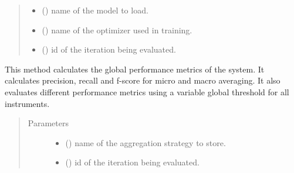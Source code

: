 \documentclass[letterpaper,10pt,english]{sphinxmanual}
\begin{document}
\begin{fulllineitems}
\begin{fulllineitems}
\begin{quote}
\begin{description}
\begin{itemize}
\item {} 
 () \textendash{} name of the model to load.

\item {} 
 () \textendash{} name of the optimizer used in training.

\item {} 
 () \textendash{} id of the iteration being evaluated.

\end{itemize}

\end{description}\end{quote}

\end{fulllineitems}


\begin{fulllineitems}
\label{\detokenize{evaluate:evaluate.Evaluator.global_performance_metrics}}
This method calculates the global performance metrics of the system. It
calculates precision, recall and f-score for micro and macro averaging.
It also evaluates different performance metrics using a variable global threshold 
for all instruments.
\begin{quote}\begin{description}
\item[{Parameters}] \leavevmode\begin{itemize}
\item {} 
 () \textendash{} name of the aggregation strategy to store.

\item {} 
 () \textendash{} id of the iteration being evaluated.

\end{itemize}

\end{description}\end{quote}

\end{fulllineitems}


\end{fulllineitems}
\end{document}
